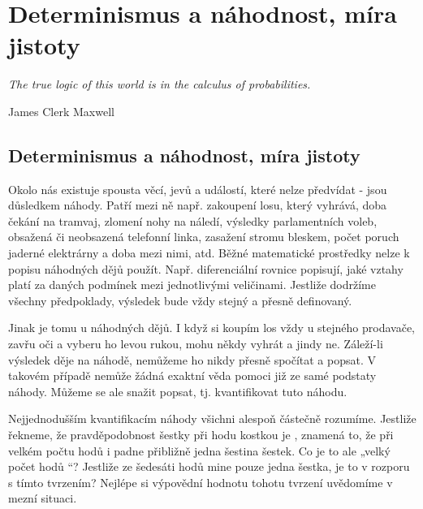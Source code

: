 \graphicspath{{../src/MAI/img/}}
\setchaptertoc
\chapter{Determinismus a náhodnost, míra jistoty}\label{mai:IchapIVa}
  \epigraph{\emph{The true logic of this world is in the calculus of probabilities.}}{James Clerk 
    Maxwell}
  \section{Determinismus a náhodnost, míra jistoty}
    Okolo nás existuje spousta věcí, jevů a událostí, které nelze předvídat - jsou důsledkem náhody.
    Patří mezi ně např. zakoupení losu, který vyhrává, doba čekání na tramvaj, zlomení nohy na
    náledí, výsledky parlamentních voleb, obsažená či neobsazená telefonní linka, zasažení stromu
    bleskem, počet poruch jaderné elektrárny a doba mezi nimi, atd. Běžné matematické prostředky
    nelze k popisu náhodných dějů použít. Např. diferenciální rovnice popisují, jaké vztahy platí za
    daných podmínek mezi jednotlivými veličinami. Jestliže dodržíme všechny předpoklady, výsledek
    bude vždy stejný a přesně definovaný.
    
    Jinak je tomu u náhodných dějů. I když si koupím los vždy u stejného prodavače, zavřu oči a
    vyberu ho levou rukou, mohu někdy vyhrát a jindy ne. Záleží-li výsledek děje na náhodě, nemůžeme
    ho nikdy přesně spočítat a popsat. V takovém případě nemůže žádná exaktní věda pomoci již ze
    samé podstaty náhody. Můžeme se ale snažit popsat, tj. kvantiﬁkovat tuto náhodu.
    
    Nejjednodušším kvantiﬁkacím náhody všichni alespoň částečně rozumíme. Jestliže řekneme, že
    pravděpodobnost šestky při hodu kostkou je , znamená to, že při velkém počtu hodů i
    padne přibližně jedna šestina šestek. Co je to ale „velký počet hodů “? Jestliže ze šedesáti
    hodů mine pouze jedna šestka, je to v rozporu s tímto tvrzením? Nejlépe si výpovědní hodnotu
    tohotu tvrzení uvědomíme v mezní situaci.

    

